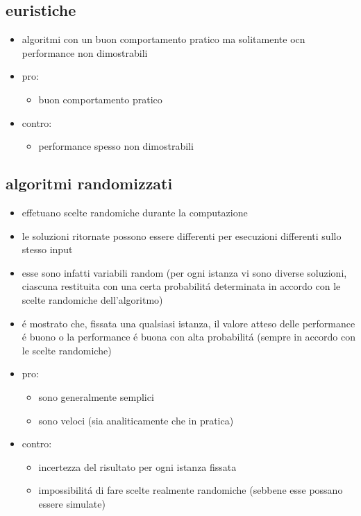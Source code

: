 
\subsection*{euristiche}
\begin{flushleft}
	\begin{itemize}
		\item algoritmi con un buon comportamento pratico ma solitamente ocn performance non dimostrabili
		\item pro:
		\begin{itemize}
			\item buon comportamento pratico
		\end{itemize}
		\item contro:
		\begin{itemize}
			\item performance spesso non dimostrabili
		\end{itemize}
	\end{itemize}
\end{flushleft}


\subsection*{algoritmi randomizzati}
\begin{flushleft}
	\begin{itemize}
		\item effetuano scelte randomiche durante la computazione
		\item le soluzioni ritornate possono essere differenti per esecuzioni differenti sullo stesso input
		\item esse sono infatti variabili random (per ogni istanza vi sono diverse soluzioni, ciascuna restituita con una certa probabilit\'a determinata in accordo con le scelte randomiche dell'algoritmo)
		\item \'e mostrato che, fissata una qualsiasi istanza, il valore atteso delle performance \'e buono o la performance \'e buona con alta probabilit\'a (sempre in accordo con le scelte randomiche)
		\item pro:
		\begin{itemize}
			\item sono generalmente semplici
			\item sono veloci (sia analiticamente che in pratica)
		\end{itemize}
		\item contro:
		\begin{itemize}
			\item incertezza del risultato per ogni istanza fissata
			\item impossibilit\'a di fare scelte realmente randomiche (sebbene esse possano essere simulate)
		\end{itemize}
	\end{itemize}
\end{flushleft}

